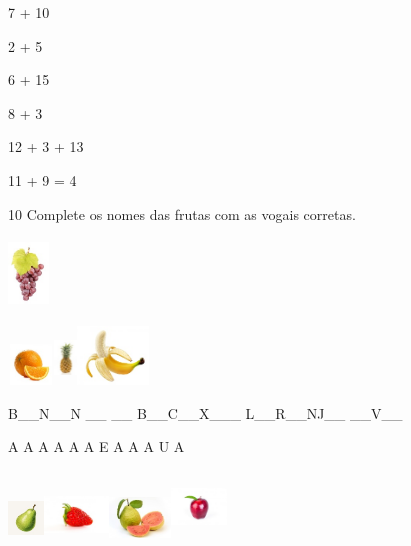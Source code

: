 {{7 + 10

2 + 5

6 + 15

8 + 3

12 + 3 + 13

11 + 9 = 4

\num{10} Complete os nomes das frutas com as vogais corretas.


\includegraphics[width=0.42675in,height=0.72128in]{media/image69.jpeg}

\includegraphics[width=0.47708in,height=0.42778in]{media/image70.jpeg}\includegraphics[width=0.24167in,height=0.56597in]{media/image71.jpeg}\includegraphics[width=0.74522in,height=0.61494in]{media/image72.jpeg}

B\_\_N\_\_N \_\_ \_\_ B\_\_C\_\_X\_\_\_ L\_\_R\_\_NJ\_\_ \_\_V\_\_

A A A A A A E A A A U A

\includegraphics[width=0.37580in,height=0.49340in]{media/image73.jpeg}\includegraphics[width=0.67500in,height=0.56111in]{media/image74.jpeg}\includegraphics[width=0.64462in,height=0.50955in]{media/image75.jpeg}\includegraphics[width=0.58584in,height=0.73807in]{media/image76.jpeg}

}}
